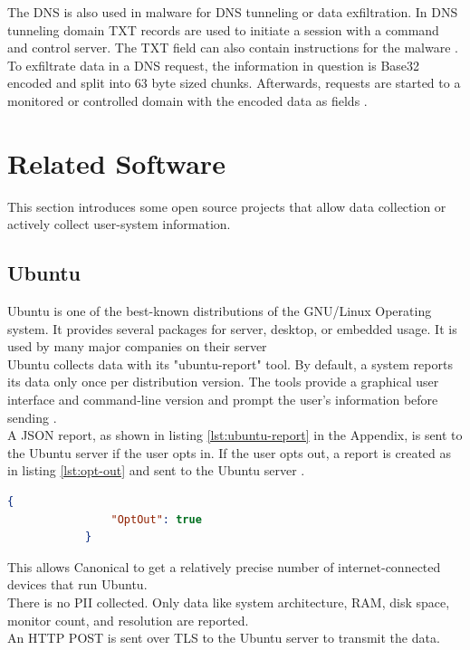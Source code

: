         
        The DNS is also used in malware for DNS tunneling or data exfiltration.
        In DNS tunneling domain TXT records are used to initiate a session with a command and control server. The TXT field can also contain instructions for the malware \cite{das_detection_2017}.\\
        To exfiltrate data in a DNS request, the information in question is Base32 encoded and split into 63 byte sized chunks. Afterwards, requests are started to a monitored or controlled domain with the encoded data as fields \cite{mertens_infosec_2017}.\\
        
\newpage
\section{Related Software}
    \label{sec:related:related_sw}
    This section introduces some open source projects that allow data collection or actively collect user-system information. 
    
    \subsection{Ubuntu}
        Ubuntu is one of the best-known distributions of the GNU/Linux Operating system. It provides several packages for server, desktop, or embedded usage. It is used by many major companies on their server \cite{canonical_enterprise_nodate}\\
        Ubuntu collects data with its "ubuntu-report" tool. By default, a system reports its data only once per distribution version. The tools provide a graphical user interface and command-line version and prompt the user's information before sending \cite{roche_ubuntuubuntu-report_2020}.\\
        A JSON report, as shown in listing \ref{lst:ubuntu-report} in the Appendix, is sent to the Ubuntu server if the user opts in. If the user opts out, a report is created as in listing \ref{lst:opt-out} and sent to the Ubuntu server \cite{roche_ubuntuubuntu-report_2020}.\\ 
        \begin{lstlisting}[language=json, caption=JSON report on opt out, label=lst:opt-out]
            {
                "OptOut": true
            }
        \end{lstlisting}
        This allows Canonical to get a relatively precise number of internet-connected devices that run Ubuntu.\\
        There is no PII collected. Only data like system architecture, RAM, disk space, monitor count, and resolution are reported.\\
        An HTTP POST is sent over TLS to the Ubuntu server to transmit the data.\\
        
